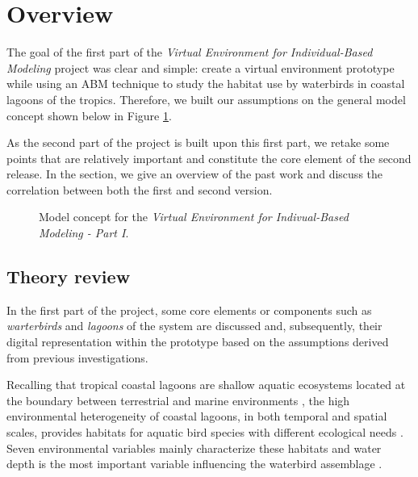 %
%
%


\section{Overview}
The goal of the first part of the \emph{Virtual Environment for Individual-Based Modeling} project was clear and simple: create a virtual environment prototype while using an ABM technique to study the habitat use by waterbirds in coastal lagoons of the tropics. Therefore, we built our assumptions on the general model concept shown below in Figure \ref{fig:concept-1v}.

As the second part of the project is built upon this first part, we retake some points that are relatively important and constitute the core element of the second release. In the section, we give an overview of the past work and discuss the correlation between both the first and second version.

\begin{figure}[!ht]
    \centering
    \caption{Model concept for the \emph{Virtual Environment for Indivual-Based Modeling - Part I}.}
    \label{fig:concept-1v}
\end{figure}

\subsection{Theory review}
In the first part of the project, some core elements or components such as  \emph{warterbirds} and \emph{lagoons} of the system are discussed and, subsequently, their digital representation within the prototype based on the assumptions derived from previous investigations.

Recalling that tropical coastal lagoons are shallow aquatic ecosystems located at the boundary between terrestrial and marine environments \cite{tavares2015environmental}, the high environmental heterogeneity of coastal lagoons, in both temporal and spatial scales, provides habitats for aquatic bird species with different ecological needs \cite{ntiamoa1998water, paracuellos2004factors, tavares2013inventory}. Seven environmental variables mainly characterize these habitats and water depth is the most important variable influencing the waterbird assemblage \cite{tavares2015environmental}.

